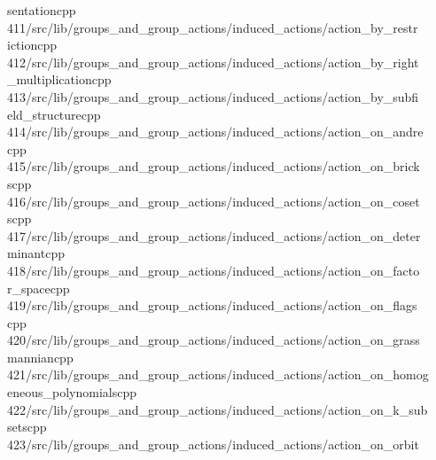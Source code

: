 \begin{tabbing}
\>sentationcpp\\[0pt]
411\>/src/lib/groups\_and\_group\_actions/induced\_actions/action\_by\_restr\\[0pt]
\>ictioncpp\\[0pt]
412\>/src/lib/groups\_and\_group\_actions/induced\_actions/action\_by\_right\\[0pt]
\>\_multiplicationcpp\\[0pt]
413\>/src/lib/groups\_and\_group\_actions/induced\_actions/action\_by\_subfi\\[0pt]
\>eld\_structurecpp\\[0pt]
414\>/src/lib/groups\_and\_group\_actions/induced\_actions/action\_on\_andre\\[0pt]
\>cpp\\[0pt]
415\>/src/lib/groups\_and\_group\_actions/induced\_actions/action\_on\_brick\\[0pt]
\>scpp\\[0pt]
416\>/src/lib/groups\_and\_group\_actions/induced\_actions/action\_on\_coset\\[0pt]
\>scpp\\[0pt]
417\>/src/lib/groups\_and\_group\_actions/induced\_actions/action\_on\_deter\\[0pt]
\>minantcpp\\[0pt]
418\>/src/lib/groups\_and\_group\_actions/induced\_actions/action\_on\_facto\\[0pt]
\>r\_spacecpp\\[0pt]
419\>/src/lib/groups\_and\_group\_actions/induced\_actions/action\_on\_flags\\[0pt]
\>cpp\\[0pt]
420\>/src/lib/groups\_and\_group\_actions/induced\_actions/action\_on\_grass\\[0pt]
\>manniancpp\\[0pt]
421\>/src/lib/groups\_and\_group\_actions/induced\_actions/action\_on\_homog\\[0pt]
\>eneous\_polynomialscpp\\[0pt]
422\>/src/lib/groups\_and\_group\_actions/induced\_actions/action\_on\_k\_sub\\[0pt]
\>setscpp\\[0pt]
423\>/src/lib/groups\_and\_group\_actions/induced\_actions/action\_on\_orbit\\[0pt]

\end{tabbing}
